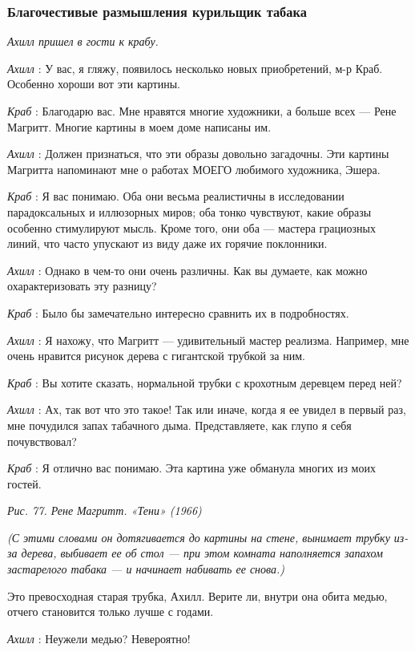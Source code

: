 \subsubsection{Благочестивые размышления курильщик табака}

\emph{Ахилл пришел в гости к крабу.}

\emph{Ахилл} : У вас, я гляжу, появилось несколько новых приобретений, м-р Краб. Особенно хороши вот эти картины.

\emph{Краб} : Благодарю вас. Мне нравятся многие художники, а больше всех --- Рене Магритт. Многие картины в моем доме написаны им.

\emph{Ахилл} : Должен признаться, что эти образы довольно загадочны. Эти картины Магритта напоминают мне о работах МОЕГО любимого художника, Эшера.

\emph{Краб} : Я вас понимаю. Оба они весьма реалистичны в исследовании парадоксальных и иллюзорных миров; оба тонко чувствуют, какие образы особенно стимулируют мысль. Кроме того, они оба --- мастера грациозных линий, что часто упускают из виду даже их горячие поклонники.

\emph{Ахилл} : Однако в чем-то они очень различны. Как вы думаете, как можно охарактеризовать эту разницу?

\emph{Краб} : Было бы замечательно интересно сравнить их в подробностях.

\emph{Ахилл} : Я нахожу, что Магритт --- удивительный мастер реализма. Например, мне очень нравится рисунок дерева с гигантской трубкой за ним.

\emph{Краб} : Вы хотите сказать, нормальной трубки с крохотным деревцем перед ней?

\emph{Ахилл} : Ах, так вот что это такое! Так или иначе, когда я ее увидел в первый раз, мне почудился запах табачного дыма. Представляете, как глупо я себя почувствовал?

\emph{Краб} : Я отлично вас понимаю. Эта картина уже обманула многих из моих гостей.

\emph{Рис. 77. Рене Магритт. «Тени» (1966)}

\emph{(С этими словами он дотягивается до картины на стене, вынимает трубку из-за дерева, выбивает ее об стол --- при этом комната наполняется запахом застарелого табака --- и начинает набивать ее снова.)}

Это превосходная старая трубка, Ахилл. Верите ли, внутри она обита медью, отчего становится только лучше с годами.

\emph{Ахилл} : Неужели медью? Невероятно!

